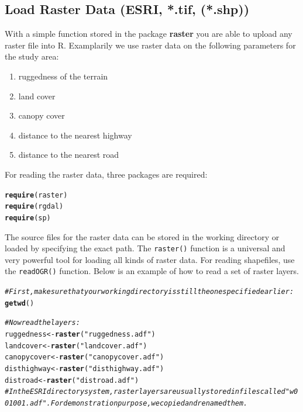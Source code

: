 \documentclass[11pt, a4paper]{article}\usepackage[]{graphicx}\usepackage[]{color}
\makeatletter
\newcommand{\hlstr}[1]{\textcolor[rgb]{0.192,0.494,0.8}{#1}}%
\newcommand{\hlcom}[1]{\textcolor[rgb]{0.678,0.584,0.686}{\textit{#1}}}%
\newcommand{\hlstd}[1]{\textcolor[rgb]{0.345,0.345,0.345}{#1}}%
\newcommand{\hlkwb}[1]{\textcolor[rgb]{0.69,0.353,0.396}{#1}}%
\newcommand{\hlkwd}[1]{\textcolor[rgb]{0.737,0.353,0.396}{\textbf{#1}}}%
\newenvironment{kframe}{%
 \def\at@end@of@kframe{}%
 \ifinner\ifhmode%
  \def\at@end@of@kframe{\end{minipage}}%
  \begin{minipage}{\columnwidth}%
 \fi\fi%
 \def\FrameCommand##1{\hskip\@totalleftmargin \hskip-\fboxsep
 \colorbox{shadecolor}{##1}\hskip-\fboxsep
     \hskip-\linewidth \hskip-\@totalleftmargin \hskip\columnwidth}%
 \MakeFramed {\advance\hsize-\width
   \@totalleftmargin\z@ \linewidth\hsize
   \@setminipage}}%
 {\par\unskip\endMakeFramed%
 \at@end@of@kframe}
\newenvironment{knitrout}{}{} %
\makeatother
\begin{document}
\subsection{Load Raster Data (ESRI, *.tif, (*.shp))}%

With a simple function stored in the package \textbf{raster} you are able to upload any raster file into R. Examplarily we use raster data on the following parameters for the study area:
\begin{enumerate}
\item{ruggedness of the terrain}
\item{land cover}
\item{canopy cover}
\item{distance to the nearest highway}
\item{distance to the nearest road}
\end{enumerate}

For reading the raster data, three packages are required:
\begin{knitrout}
\color{fgcolor}\begin{kframe}
\begin{alltt}
\hlkwd{require}\hlstd{(raster)}
\hlkwd{require}\hlstd{(rgdal)}
\hlkwd{require}\hlstd{(sp)}
\end{alltt}
\end{kframe}
\end{knitrout}

The source files for the raster data can be stored in the working directory or loaded by specifying the exact path. The \texttt{raster()} function is a universal and very powerful tool for loading all kinds of raster data. For reading shapefiles, use the \texttt{readOGR()} function. Below is an example of how to read a set of raster layers.
\begin{knitrout}
\color{fgcolor}\begin{kframe}
\begin{alltt}
\hlcom{# First, make sure that your working directory is still the one specified earlier:}
\hlkwd{getwd}\hlstd{()}

\hlcom{# Now read the layers:}
\hlstd{ruggedness} \hlkwb{<-} \hlkwd{raster}\hlstd{(}\hlstr{"ruggedness.adf"}\hlstd{)}
\hlstd{landcover} \hlkwb{<-} \hlkwd{raster}\hlstd{(}\hlstr{"landcover.adf"}\hlstd{)}
\hlstd{canopycover} \hlkwb{<-} \hlkwd{raster}\hlstd{(}\hlstr{"canopycover.adf"}\hlstd{)}
\hlstd{disthighway} \hlkwb{<-} \hlkwd{raster}\hlstd{(}\hlstr{"disthighway.adf"}\hlstd{)}
\hlstd{distroad} \hlkwb{<-} \hlkwd{raster}\hlstd{(}\hlstr{"distroad.adf"}\hlstd{)}
\hlcom{# In the ESRI directory system, raster layers are usually stored in files called "w001001.adf". For demonstration purpose, we copied and renamed them.}
\end{alltt}
\end{kframe}
\end{knitrout}
\end{document}
